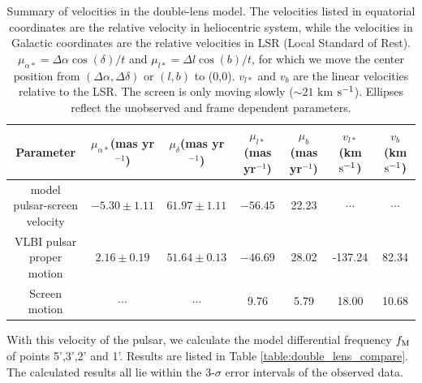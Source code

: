 \documentclass[useAMS,usenatbib]{mn2e}
\begin{document}
\begin{table}
\centering
\begin{tabular}{c|cccccc}
\hline
Parameter & $\mu_{\alpha*}$(mas yr$^{-1}$) & $\mu_{\delta}$(mas yr$^{-1}$) & $\mu_{l*}$(mas yr$^{-1}$) & $\mu_b$ (mas yr$^{-1}$) & $v_{l*}$ (km $\rm s^{-1}$) & $v_b$ (km $\rm s^{-1}$) \\
\hline
model pulsar-screen velocity & $-5.30 \pm 1.11$  & $61.97 \pm 1.11$  & $-56.45$ & 22.23 &  $\cdots$ & $\cdots$\\
VLBI pulsar proper motion & $2.16 \pm 0.19$ & $51.64 \pm 0.13$ & $-46.69$ & 28.02 & -137.24 & 82.34 \\
Screen motion & $\cdots$ & $\cdots$  & 9.76 & 5.79 & 18.00 & 10.68\\
\hline
\end{tabular}
\caption{Summary of velocities in the double-lens model.  The velocities
listed in equatorial coordinates are the relative velocity in
heliocentric system, while the velocities in Galactic coordinates are
the relative velocities in LSR (Local Standard of Rest). $\mu_{\alpha*}=\Delta\alpha\cos(\delta)/t$ and $\mu_{l*}=\Delta l\cos(b)/t$, for which we move the center position from $(\Delta\alpha,\Delta\delta)$ or $(l,b)$ to (0,0).  $v_{l*}$ and $v_b$ are the linear velocities relative to the LSR.  The screen is
only moving slowly ($\sim 21$ km $\rm s^{-1}$).  Ellipses reflect the
unobserved and frame dependent parameters.
}
\label{Table:velocity}
\end{table}





With this velocity of the pulsar, we calculate the model differential frequency $f_{\rm M}$ of points 5',3',2' and 1'. Results are listed in Table \ref{table:double_lens_compare}. The calculated results all lie within the 3-$\sigma$ error intervals of the observed data. 
\end{document}
